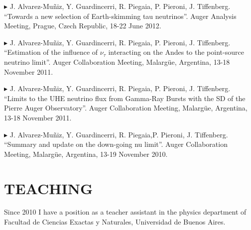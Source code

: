 \documentclass[letterpaper]{article}
\renewenvironment{itemize}{
  \begin{list}{}{
    \setlength{\leftmargin}{1.5em}
  }
}{
  \end{list}
}
\begin{document}
\begin{itemize}
  \item{$\blacktriangleright$} J. Alvarez-Muñiz, Y. Guardincerri, R. Piegaia, P. Pieroni, J. Tiffenberg. ``Towards a new selection of Earth-skimming tau neutrinos''. Auger Analysis Meeting, Prague, Czech Republic, 18-22 June 2012.
  \item{$\blacktriangleright$} J. Alvarez-Muñiz, Y. Guardincerri, R. Piegaia, P. Pieroni, J. Tiffenberg. ``Estimation of the influence of $\nu_{\tau}$ interacting on the Andes to the point-source neutrino limit''. Auger Collaboration Meeting, Malargüe, Argentina, 13-18 November 2011.
  \item{$\blacktriangleright$} J. Alvarez-Muñiz, Y. Guardincerri, R. Piegaia, P. Pieroni, J. Tiffenberg. ``Limits to the UHE neutrino flux from Gamma-Ray Bursts with the SD of the Pierre Auger Observatory''. Auger Collaboration Meeting, Malargüe, Argentina, 13-18 November 2011.
  \item{$\blacktriangleright$} J. Alvarez-Muñiz, Y. Guardincerri, R. Piegaia,P. Pieroni, J. Tiffenberg. ``Summary and update on the down-going nu limit''. Auger Collaboration Meeting, Malargüe, Argentina, 13-19 November 2010.
 
\end{itemize}


\section*{TEACHING}

Since 2010 I have a position as a teacher assistant in the physics department of Facultad de Ciencias Exactas y Naturales, Universidad de Buenos Aires.
\end{document}
